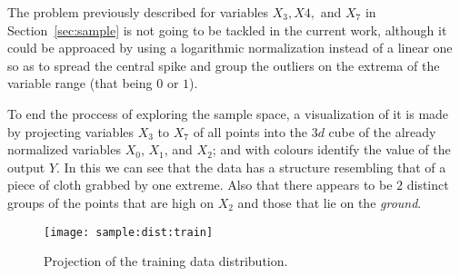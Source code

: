 \documentclass[journal]{IEEEtran}
\begin{document}
The problem previously described for variables $X_3, X4,$ and $X_7$ in
Section~\ref{sec:sample} is not going to be tackled in the current work,
although it could be approaced by using a logarithmic normalization instead of a
linear one so as to spread the central spike and group the outliers on the
extrema of the variable range (that being $0$ or $1$).

To end the proccess of exploring the sample space, a visualization of it is made
by projecting variables $X_3$ to $X_7$ of all points into the $3d$ cube of the
already normalized variables $X_0$, $X_1$, and $X_2$; and with colours identify
the value of the output $Y$. In this we can see that the data has a structure
resembling that of a piece of cloth grabbed by one extreme. Also that there
appears to be $2$ distinct groups of the points that are high on $X_2$ and those
that lie on the \textit{ground}.

\begin{figure}[ht]
    \texttt{[image: sample:dist:train]}
    \caption{Projection of the training data distribution.
    \label{fig:sample:dist:train}}
\end{figure}





\printbibliography
\end{document}
